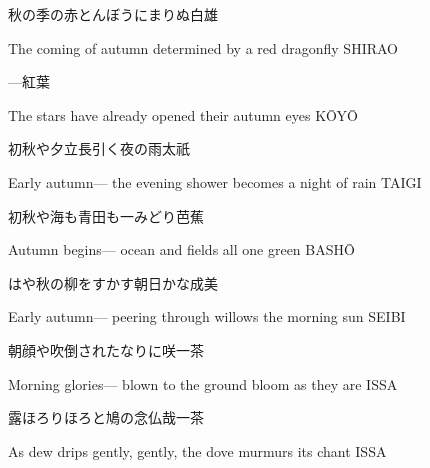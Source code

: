 \begin{haiku}
    {\FH 秋の季の赤とんぼうにまりぬ}\hfill{\FH 白雄}

    \vin{} The coming of autumn
    \vin{} \vin{} determined
    \vin{} \vin{} \vin{} by a red dragonfly \hspace{\fill} SHIRAO
\end{haiku}

\begin{haiku}
    {---}\hfill{\FH 紅葉}

    \vin{} The stars
    \vin{} \vin{} have already opened
    \vin{} \vin{} \vin{} their autumn eyes \hspace{\fill} K\={O}Y\={O}
\end{haiku}

\begin{haiku}
    {\FH 初秋や夕立長引く夜の雨}\hfill{\FH 太祇}

    \vin{} Early autumn---
    \vin{} \vin{} the evening shower becomes
    \vin{} \vin{} \vin{} a night of rain \hspace{\fill} TAIGI
\end{haiku}

\begin{haiku}
    {\FH 初秋や海も青田も一みどり}\hfill{\FH 芭蕉}

    \vin{} Autumn begins---
    \vin{} \vin{} ocean and fields
    \vin{} \vin{} \vin{} all one green \hspace{\fill} BASH\={O}
\end{haiku}

\begin{haiku}
    {\FH はや秋の柳をすかす朝日かな}\hfill{\FH 成美}

    \vin{} Early autumn---
    \vin{} \vin{} peering through willows
    \vin{} \vin{} \vin{} the morning sun \hspace{\fill} SEIBI
\end{haiku}

\begin{haiku}
    {\FH 朝顔や吹倒されたなりに咲}\hfill{\FH 一茶}

    \vin{} Morning glories---
    \vin{} \vin{} blown to the ground
    \vin{} \vin{} \vin{} bloom as they are \hspace{\fill} ISSA
\end{haiku}

\begin{haiku}
    {\FH 露ほろりほろと鳩の念仏哉}\hfill{\FH 一茶}

    \vin{} As dew drips
    \vin{} \vin{} gently, gently, the dove
    \vin{} \vin{} \vin{} murmurs its chant \hspace{\fill} ISSA
\end{haiku}

